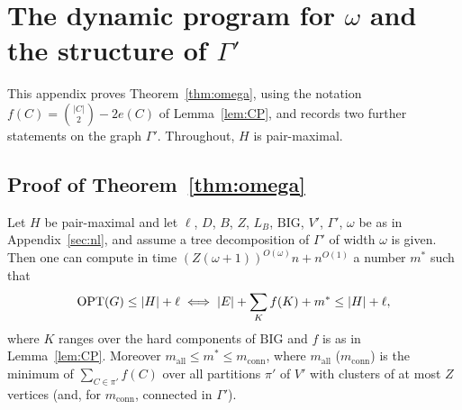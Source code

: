 \section{The dynamic program for \texorpdfstring{$\omega$}{omega} and the structure of \texorpdfstring{$\Gamma'$}{Gamma'}}\label{app:omega}
This appendix proves Theorem~\ref{thm:omega}, using the notation $f(C)=\binom{|C|}2-2e(C)$ of Lemma~\ref{lem:CP}, and records two further statements on the graph $\Gamma'$. Throughout, $H$ is pair-maximal.

\subsection{Proof of Theorem~\ref{thm:omega}}
\begin{theorem}\label{thm:omegafull}
Let $H$ be pair-maximal and let $\ell$, $D$, $B$, $Z$, $L_B$, $\mathrm{BIG}$, $V'$, $\Gamma'$, $\omega$ be as in Appendix~\ref{sec:nl}, and assume a tree decomposition of $\Gamma'$ of width $\omega$ is given. Then one can compute in time $(Z(\omega+1))^{O(\omega)}n+n^{O(1)}$ a number $m^*$ such that
\[
\mathrm{OPT}(G)\le|H|+\ell\iff|E|+\sum_{K}f(K)+m^*\le|H|+\ell ,
\]
where $K$ ranges over the hard components of $\mathrm{BIG}$ and $f$ is as in Lemma~\ref{lem:CP}. Moreover $m_{\mathrm{all}}\le m^*\le m_{\mathrm{conn}}$, where $m_{\mathrm{all}}$ ($m_{\mathrm{conn}}$) is the minimum of $\sum_{C\in\pi'}f(C)$ over all partitions $\pi'$ of $V'$ with clusters of at most $Z$ vertices (and, for $m_{\mathrm{conn}}$, connected in $\Gamma'$).
\end{theorem}
